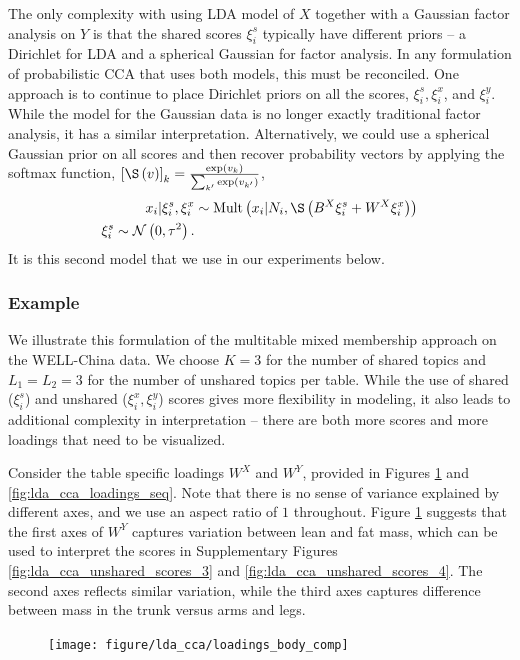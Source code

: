 \documentclass{article}
\begin{document}
The only complexity with using LDA model of $X$ together with a Gaussian factor
analysis on $Y$ is that the shared scores $\xi_{i}^{s}$ typically have different
priors -- a Dirichlet for LDA and a spherical Gaussian for factor analysis. In
any formulation of probabilistic CCA that uses both models, this must be
reconciled. One approach is to continue to place Dirichlet priors on all the
scores, $\xi_{i}^s, \xi_{i}^x$, and $\xi_{i}^y$. While the model for the
Gaussian data is no longer exactly traditional factor analysis, it has a similar
interpretation. Alternatively, we could use a spherical Gaussian prior on all
scores and then recover probability vectors by applying the softmax function,
$\left[\S\left(v\right)\right]_{k} =
\frac{\exp{v_{k}}}{\sum_{k^{\prime}}\exp{v_{k^{\prime}}}}$,
\begin{align*}
  x_{i} \vert \xi_{i}^{s}, \xi_{i}^{x} &\sim \Mult\left(x_{i} \vert N_{i},
  \S\left(B^{X} \xi_{i}^{s} + W^{X} \xi_{i}^{x}\right)\right) \\
  \xi_{i}^{s} \sim \Gsn\left(0, \tau^{2}\right).
\end{align*}
It is this second model that we use in our experiments below.

\subsubsection{Example}
\label{subsubsec:lda_cca_example}

We illustrate this formulation of the multitable mixed membership approach on
the WELL-China data. We choose $K = 3$ for the number of shared topics and
$L_{1} = L_{2} = 3$ for the number of unshared topics per table. While the use
of shared ($\xi_{i}^{s}$) and unshared ($\xi_{i}^{x}, \xi_{i}^{y}$) scores gives
more flexibility in modeling, it also leads to additional complexity in
interpretation -- there are both more scores and more loadings that need to be
visualized.

Consider the table specific loadings $W^{X}$ and $W^{Y}$, provided in Figures
\ref{fig:lda_cca_loadings_body_comp} and \ref{fig:lda_cca_loadings_seq}. Note
that there is no sense of variance explained by different axes, and we use an
aspect ratio of $1$ throughout. Figure \ref{fig:lda_cca_loadings_body_comp}
suggests that the first axes of $W^{Y}$ captures variation between lean and fat
mass, which can be used to interpret the scores in Supplementary Figures
\ref{fig:lda_cca_unshared_scores_3} and \ref{fig:lda_cca_unshared_scores_4}. The
second axes reflects similar variation, while the third axes captures difference
between mass in the trunk versus arms and legs.
\begin{figure}[ht]
  \centering
  \texttt{[image: figure/lda\_cca/loadings\_body\_comp]}
  \caption{\label{fig:lda_cca_loadings_body_comp} }
\end{figure}
\end{document}
